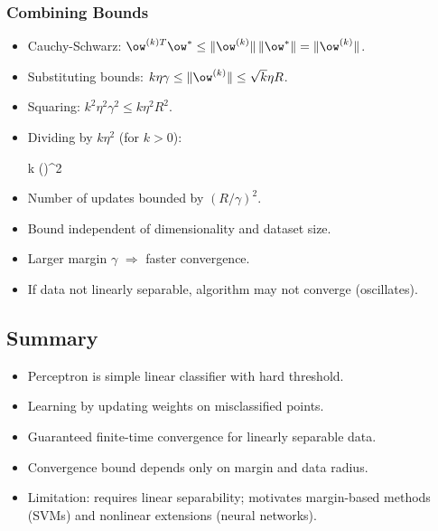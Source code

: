 \subsubsection*{Combining Bounds}
\begin{itemize}
    \item Cauchy-Schwarz: $\ow^{(k)T}\ow^* \le \|\ow^{(k)}\|\,\|\ow^*\| = \|\ow^{(k)}\|$.
    \item Substituting bounds: $k\eta\gamma \le \|\ow^{(k)}\| \le \sqrt{k}\eta R$.
    \item Squaring: $k^2 \eta^2 \gamma^2 \le k \eta^2 R^2$.
    \item Dividing by $k\eta^2$ (for $k>0$):
    \begin{myequation}
    k \le \left(\right)^2
    \end{myequation}
    \item Number of updates bounded by $(R/\gamma)^2$.
    \item Bound independent of dimensionality and dataset size.
    \item Larger margin $\gamma$ $\Rightarrow$ faster convergence.
    \item If data not linearly separable, algorithm may not converge (oscillates).
\end{itemize}

\subsection*{Summary}
\begin{itemize}
    \item Perceptron is simple linear classifier with hard threshold.
    \item Learning by updating weights on misclassified points.
    \item Guaranteed finite-time convergence for linearly separable data.
    \item Convergence bound depends only on margin and data radius.
    \item Limitation: requires linear separability; motivates margin-based methods (SVMs) and nonlinear extensions (neural networks).
\end{itemize}

